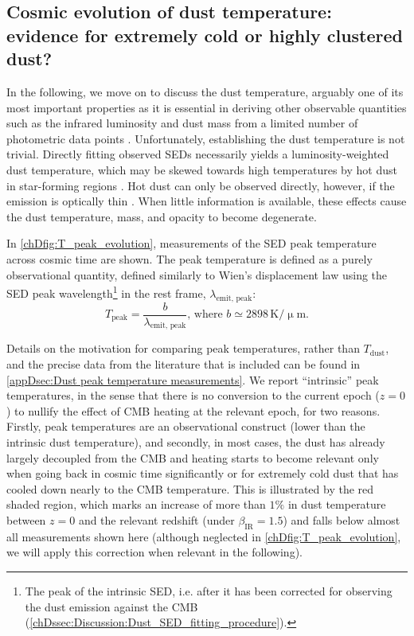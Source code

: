 \subsection{Cosmic evolution of dust temperature: evidence for extremely cold or highly clustered dust?}
\label{chDssec:Discussion:Dust_temperatures}

In the following, we move on to discuss the dust temperature, arguably one of its most important properties as it is essential in deriving other observable quantities such as the infrared luminosity and dust mass from a limited number of photometric data points \citep{2020MNRAS.497..956S, 2022MNRAS.513.3122S}. Unfortunately, establishing the dust temperature is not trivial. Directly fitting observed SEDs necessarily yields a luminosity-weighted dust temperature, which may be skewed towards high temperatures by hot dust in star-forming regions \citep{2019MNRAS.489.1397L}. Hot dust can only be observed directly, however, if the emission is optically thin \citep{2020MNRAS.498.4192F}. When little information is available, these effects cause the dust temperature, mass, and opacity to become degenerate.

In \cref{chDfig:T_peak_evolution}, measurements of the SED peak temperature across cosmic time are shown. The peak temperature is defined as a purely observational quantity, defined similarly to Wien's displacement law using the SED peak wavelength\footnote{The peak of the intrinsic SED, i.e. after it has been corrected for observing the dust emission against the CMB (\cref{chDssec:Discussion:Dust_SED_fitting_procedure}).} in the rest frame, $\lambda_\text{emit, peak}$:
\begin{equation}
    \label{chDeq:T_peak}
    T_\text{peak} = \frac{b}{\lambda_\text{emit, peak}} \text{, where } b \simeq 2898 \, \mathrm{K / \upmu m}.
\end{equation}

Details on the motivation for comparing peak temperatures, rather than $T_\text{dust}$, and the precise data from the literature that is included can be found in \cref{appDsec:Dust peak temperature measurements}. We report ``intrinsic'' peak temperatures, in the sense that there is no conversion to the current epoch ($z=0$) to nullify the effect of CMB heating at the relevant epoch, for two reasons. Firstly, peak temperatures are an observational construct (lower than the intrinsic dust temperature), and secondly, in most cases, the dust has already largely decoupled from the CMB and heating \citep[described by equation (12) of][]{2013ApJ...766...13D} starts to become relevant only when going back in cosmic time significantly or for extremely cold dust that has cooled down nearly to the CMB temperature. This is illustrated by the red shaded region, which marks an increase of more than $1\%$ in dust temperature between $z=0$ and the relevant redshift (under $\beta_\text{IR} = 1.5$) and falls below almost all measurements shown here (although neglected in \cref{chDfig:T_peak_evolution}, we will apply this correction when relevant in the following).

